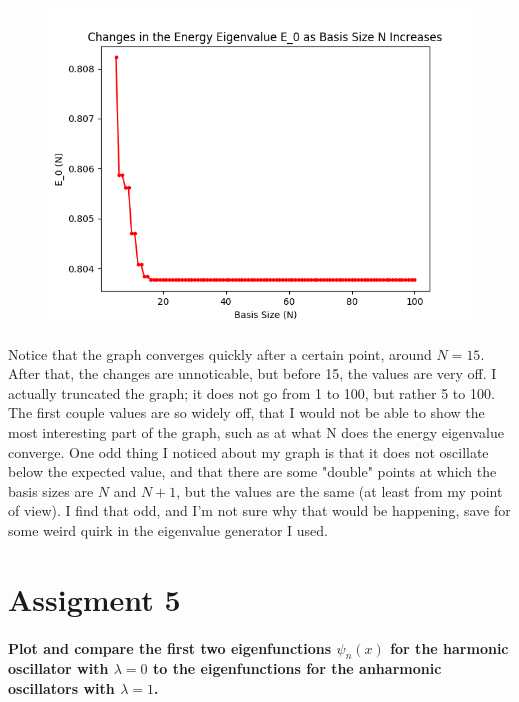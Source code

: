 \documentclass[12pt]{article}
\begin{document}
\begin{figure}[H]
\begin{center}
\includegraphics[scale=0.8]{basis.png}
\end{center}
\end{figure}

Notice that the graph converges quickly after a certain point, around $N=15$. After that, the changes are unnoticable, but before 15, the values are very off. I actually truncated the graph; it does not go from 1 to 100, but rather 5 to 100. The first couple values are so widely off, that I would not be able to show the most interesting part of the graph, such as at what N does the energy eigenvalue converge. One odd thing I noticed about my graph is that it does not oscillate below the expected value, and that there are some "double" points at which the basis sizes are $N$ and $N+1$, but the values are the same (at least from my point of view). I find that odd, and I'm not sure why that would be happening, save for some weird quirk in the eigenvalue generator I used.


\section{Assigment 5}

\paragraph{Plot and compare the first two eigenfunctions $\psi_n(x)$ for the harmonic oscillator with $\lambda = 0$ to the eigenfunctions for the anharmonic oscillators with $\lambda = 1$.}
\end{document}
